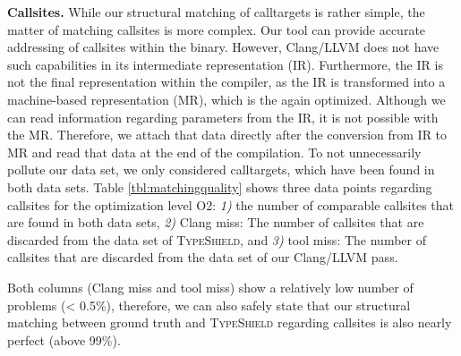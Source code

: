\textbf{Callsites.} While our structural matching of calltargets is rather simple, the matter of matching callsites is more complex. Our tool can provide accurate addressing of callsites within the binary. 
However, Clang/LLVM does not have such capabilities in its intermediate representation (IR). Furthermore, the IR is not the final representation within the compiler, as the IR is transformed into a machine-based representation (MR), which is the again optimized. Although we can read information regarding parameters from the IR, it is not possible with the MR. 
Therefore, we attach that data directly after the conversion from IR to MR and read that data at the end of the compilation. To not unnecessarily pollute our data set, we only considered calltargets, which have been found in both data sets. 
Table \ref{tbl:matchingquality} shows three data points regarding callsites for the optimization level O2:
\textit{1)} the number of comparable callsites that are found in both data sets,
\textit{2)} Clang miss: The number of callsites that are discarded from the data set of \textsc{TypeShield}, and
\textit{3)} tool miss: The number of callsites that are discarded from the data set of our Clang/LLVM pass.

Both columns (Clang miss and tool miss) show a relatively low number of problems (< 0.5\%), therefore, we can also 
safely state that our structural matching between ground truth and \textsc{TypeShield} regarding callsites is also nearly perfect (above 99\%).

